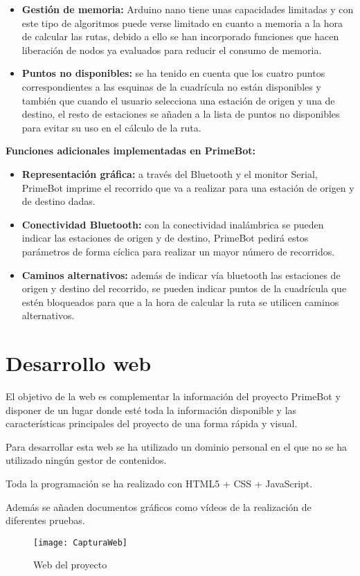 \begin{itemize}
\tightlist
\item
  \textbf{Gestión de memoria:} Arduino nano tiene unas capacidades limitadas y con este tipo de algoritmos puede verse limitado en cuanto a memoria a la hora de calcular las rutas, debido a ello se han incorporado funciones que hacen liberación de nodos ya evaluados para reducir el consumo de memoria.
\item
  \textbf{Puntos no disponibles:} se ha tenido en cuenta que los cuatro puntos correspondientes a las esquinas de la cuadrícula no están disponibles y también que cuando el usuario selecciona una estación de origen y una de destino, el resto de estaciones se añaden a la lista de puntos no disponibles para evitar su uso en el cálculo de la ruta.
\end{itemize}


\textbf{Funciones adicionales implementadas en PrimeBot: }
\begin{itemize}
\tightlist
\item
    \textbf{Representación gráfica:} a través del Bluetooth y el monitor Serial, PrimeBot imprime el recorrido que va a realizar para una estación de origen y de destino dadas.
\item
    \textbf{Conectividad Bluetooth:} con la conectividad inalámbrica se pueden indicar las estaciones de origen y de destino, PrimeBot pedirá estos parámetros de forma cíclica para realizar un mayor número de recorridos.
  \item
    \textbf{Caminos alternativos:} además de indicar vía bluetooth las estaciones de origen y destino del recorrido, se pueden indicar puntos de la cuadrícula que estén bloqueados para que a la hora de calcular la ruta se utilicen caminos alternativos.
\end{itemize}

\newpage
\section{Desarrollo web}\label{web}

El objetivo de la web es complementar la información del proyecto PrimeBot y disponer de un lugar donde esté toda la información disponible y las características principales del proyecto de una forma rápida y visual.

Para desarrollar esta web se ha utilizado un dominio personal en el que no se ha utilizado ningún gestor de contenidos.

Toda la programación se ha realizado con HTML5 + CSS + JavaScript.

Además se añaden documentos gráficos como vídeos de la realización de diferentes pruebas.
\begin{figure}[h]
	\centering
	\texttt{[image: CapturaWeb]}
	\caption{Web del proyecto}
	\label{fig:5.5}
\end{figure}